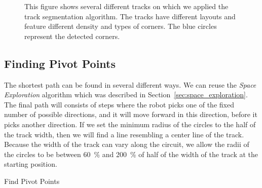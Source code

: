 \begin{figure}
	\label{fig:corner_detection}
	\caption{This figure shows several different tracks on which we applied the track segmentation algorithm. The tracks have different layouts and feature different density and types of corners. The blue circles represent the detected corners.}
\end{figure}


\subsection{Finding Pivot Points}
The shortest path can be found in several different ways. We can reuse the \textit{Space Exploration} algorithm which was described in Section~\ref{sec:space_exploration}. The final path will consists of steps where the robot picks one of the fixed number of possible directions, and it will move forward in this direction, before it picks another direction. If we set the minimum radius of the circles to the half of the track width, then we will find a line resembling a center line of the track. Because the width of the track can vary along the circuit, we allow the radii of the circles to be between \SI{60}{\percent} and \SI{200}{\percent} of half of the width of the track at the starting position.

\begin{algorithm}
	\caption{Find Pivot Points}
	\label{alg:find_pivots}
	
	\SetAlgoLined
	\DontPrintSemicolon
	
	
		
		
	\BlankLine
	

	\BlankLine

\end{algorithm}

